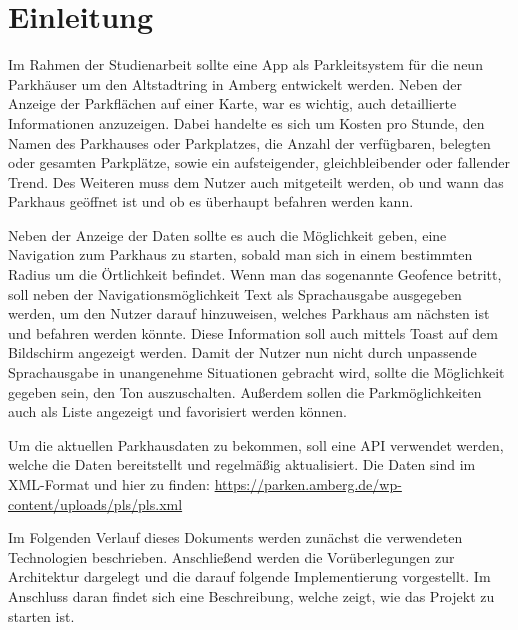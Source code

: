 \chapter{Einleitung}

Im Rahmen der Studienarbeit sollte eine App als Parkleitsystem für die neun Parkhäuser um den Altstadtring in Amberg entwickelt werden. Neben der Anzeige der Parkflächen auf einer Karte, war es wichtig, auch detaillierte Informationen anzuzeigen. Dabei handelte es sich um Kosten pro Stunde, den Namen des Parkhauses oder Parkplatzes, die Anzahl der verfügbaren, belegten oder gesamten Parkplätze, sowie ein aufsteigender, gleichbleibender oder fallender Trend. Des Weiteren muss dem Nutzer auch mitgeteilt werden, ob und wann das Parkhaus geöffnet ist und ob es überhaupt befahren werden kann.

Neben der Anzeige der Daten sollte es auch die Möglichkeit geben, eine Navigation zum Parkhaus zu starten, sobald man sich in einem bestimmten Radius um die Örtlichkeit befindet. Wenn man das sogenannte Geofence betritt, soll neben der Navigationsmöglichkeit Text als Sprachausgabe ausgegeben werden, um den Nutzer darauf hinzuweisen, welches Parkhaus am nächsten ist und befahren werden könnte. Diese Information soll auch mittels Toast auf dem Bildschirm angezeigt werden. Damit der Nutzer nun nicht durch unpassende Sprachausgabe in unangenehme Situationen gebracht wird, sollte die Möglichkeit gegeben sein, den Ton auszuschalten. Außerdem sollen die Parkmöglichkeiten auch als Liste angezeigt und favorisiert werden können.

Um die aktuellen Parkhausdaten zu bekommen, soll eine API verwendet werden, welche die Daten bereitstellt und regelmäßig aktualisiert. Die Daten sind im XML-Format und hier zu finden: \url{https://parken.amberg.de/wp-content/uploads/pls/pls.xml}

Im Folgenden Verlauf dieses Dokuments werden zunächst die verwendeten Technologien beschrieben. Anschließend werden die Vorüberlegungen zur Architektur dargelegt und die darauf folgende Implementierung vorgestellt. Im Anschluss daran findet sich eine Beschreibung, welche zeigt, wie das Projekt zu starten ist.